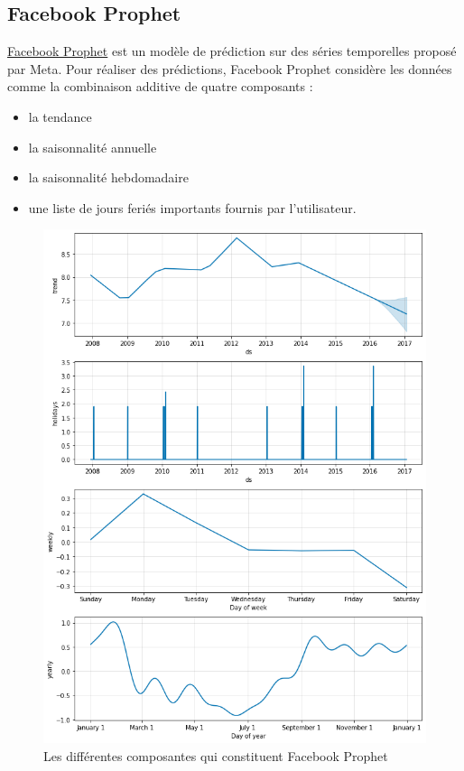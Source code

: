 \documentclass[french]{article}
\begin{document}
    \subsection{Facebook Prophet}

    \href{https://facebook.github.io/prophet/}{Facebook Prophet} est un modèle de prédiction sur des séries temporelles proposé par Meta. 
    Pour réaliser des prédictions, Facebook Prophet considère les données comme la combinaison additive de quatre composants\cite{meta} : 
    \begin{itemize}
        \item la tendance
        \item la saisonnalité annuelle
        \item la saisonnalité hebdomadaire
        \item une liste de jours feriés importants fournis par l'utilisateur.
    \end{itemize}
    \begin{figure}[h]
        \includegraphics[width=12cm]{facebook_prophet}
        \centering
        \caption{Les différentes composantes qui constituent Facebook Prophet}
        \centering
    \end{figure}
\end{document}
